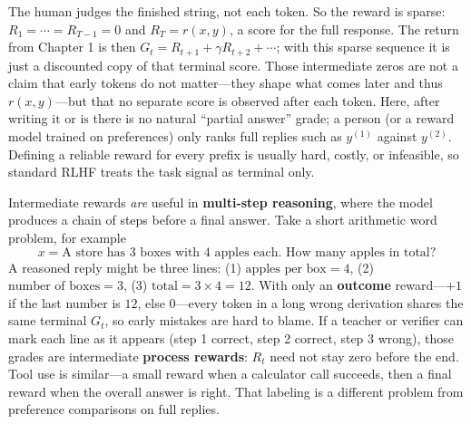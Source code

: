 The human judges the finished string, not each token. So the reward is sparse: $R_1=\cdots=R_{T-1}=0$ and $R_T=r(x,y)$, a score for the full response. The return from Chapter 1 is then $G_t=R_{t+1}+\gamma R_{t+2}+\cdots$; with this sparse sequence it is just a discounted copy of that terminal score. Those intermediate zeros are not a claim that early tokens do not matter---they shape what comes later and thus $r(x,y)$---but that no separate score is observed after each token. Here, after writing $\text{it}$ or $\text{is}$ there is no natural ``partial answer'' grade; a person (or a reward model trained on preferences) only ranks full replies such as $y^{(1)}$ against $y^{(2)}$. Defining a reliable reward for every prefix is usually hard, costly, or infeasible, so standard RLHF treats the task signal as terminal only.

\begin{asidenote}[Note]
Intermediate rewards \textit{are} useful in \textbf{multi-step reasoning}, where the model produces a chain of steps before a final answer. Take a short arithmetic word problem, for example \[
x=\text{A store has 3 boxes with 4 apples each. How many apples in total?}
\] A reasoned reply might be three lines: (1) $\text{apples per box}=4$, (2) $\text{number of boxes}=3$, (3) $\text{total}=3\times 4=12$. With only an \textbf{outcome} reward---$+1$ if the last number is $12$, else $0$---every token in a long wrong derivation shares the same terminal $G_t$, so early mistakes are hard to blame. If a teacher or verifier can mark each line as it appears (step 1 correct, step 2 correct, step 3 wrong), those grades are intermediate \textbf{process rewards}: $R_t$ need not stay zero before the end. Tool use is similar---a small reward when a calculator call succeeds, then a final reward when the overall answer is right. That labeling is a different problem from preference comparisons on full replies.

\end{asidenote}

